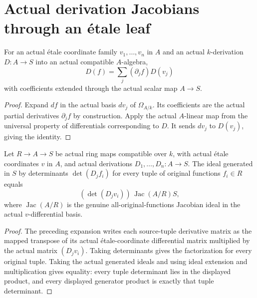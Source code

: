 \section{Actual derivation Jacobians through an \'etale leaf}

\begin{lemma}\label{lem:sc0-etale-derivation-expansion}
\leanok
{}
For an actual \'etale coordinate family $v_1,\ldots,v_n$ in $A$ and an actual
$k$-derivation $D:A\to S$ into an actual compatible $A$-algebra,
\[
 D(f)=\sum_j (\partial_j f) D(v_j)
\]
with coefficients extended through the actual scalar map $A\to S$.
\end{lemma}
\begin{proof}
Expand $df$ in the actual basis $dv_j$ of $\Omega_{A/k}$. Its coefficients
are the actual partial derivatives $\partial_jf$ by construction. Apply
the actual $A$-linear map from the universal property of differentials
corresponding to $D$. It sends $dv_j$ to $D(v_j)$, giving the identity.
\end{proof}

\begin{theorem}\label{thm:sc0-etale-derivation-jacobian-ideal}
\leanok
{}
Let $R\to A\to S$ be actual ring maps compatible over $k$, with actual
\'etale coordinates $v$ in $A$, and actual derivations $D_1,\ldots,D_n:A\to S$.
The ideal generated in $S$ by determinants $\det(D_jf_i)$ for every tuple
of original functions $f_i\in R$ equals
\[
 (\det(D_jv_i))\,\operatorname{Jac}(A/R)S,
\]
where $\operatorname{Jac}(A/R)$ is the genuine all-original-functions
Jacobian ideal in the actual $v$-differential basis.
\end{theorem}
\begin{proof}
The preceding expansion writes each source-tuple derivative matrix as
the mapped transpose of its actual \'etale-coordinate differential matrix
multiplied by the actual matrix $(D_jv_i)$. Taking determinants gives the
factorization for every original tuple. Taking the actual generated ideals
and using ideal extension and multiplication gives equality: every tuple
determinant lies in the displayed product, and every displayed generator
product is exactly that tuple determinant.
\end{proof}
